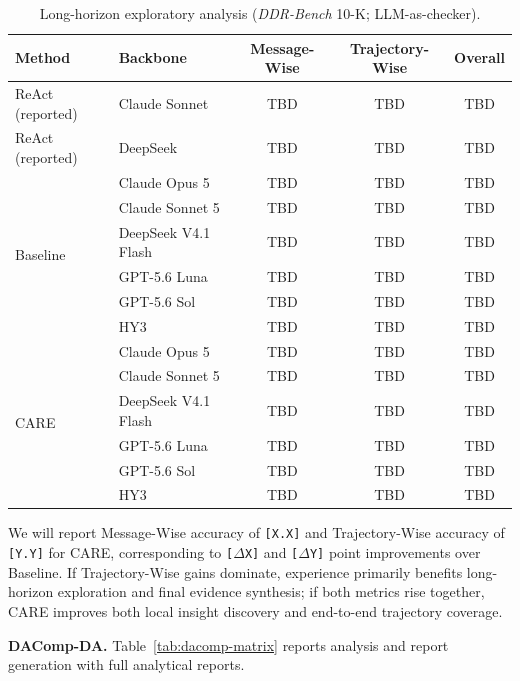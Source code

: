 \documentclass{article}
\newcommand{\method}{\textsc{CARE}}
\begin{document}
\begin{table}[t]
  \caption{Long-horizon exploratory analysis (\textit{DDR-Bench} 10-K; LLM-as-checker).}
  \label{tab:ddr-matrix}
  \centering
  \scriptsize
  \begin{tabular}{llccc}
    \toprule
    Method & Backbone & Message-Wise & Trajectory-Wise & Overall \\
    \midrule
    ReAct (reported) & Claude Sonnet & TBD & TBD & TBD \\
    ReAct (reported) & DeepSeek & TBD & TBD & TBD \\
    \midrule
    \multirow{6}{*}{Baseline}
      & Claude Opus 5 & TBD & TBD & TBD \\
      & Claude Sonnet 5 & TBD & TBD & TBD \\
      & DeepSeek V4.1 Flash & TBD & TBD & TBD \\
      & GPT-5.6 Luna & TBD & TBD & TBD \\
      & GPT-5.6 Sol & TBD & TBD & TBD \\
      & HY3 & TBD & TBD & TBD \\
    \midrule
    \multirow{6}{*}{\method{}}
      & Claude Opus 5 & TBD & TBD & TBD \\
      & Claude Sonnet 5 & TBD & TBD & TBD \\
      & DeepSeek V4.1 Flash & TBD & TBD & TBD \\
      & GPT-5.6 Luna & TBD & TBD & TBD \\
      & GPT-5.6 Sol & TBD & TBD & TBD \\
      & HY3 & TBD & TBD & TBD \\
    \bottomrule
  \end{tabular}
\end{table}

We will report Message-Wise accuracy of \texttt{[X.X]} and Trajectory-Wise accuracy of \texttt{[Y.Y]} for \method{}, corresponding to \texttt{[$\Delta$X]} and \texttt{[$\Delta$Y]} point improvements over Baseline.
If Trajectory-Wise gains dominate, experience primarily benefits long-horizon exploration and final evidence synthesis; if both metrics rise together, \method{} improves both local insight discovery and end-to-end trajectory coverage.

\noindent\textbf{DAComp-DA.} Table~\ref{tab:dacomp-matrix} reports analysis and report generation with full analytical reports.
\end{document}
